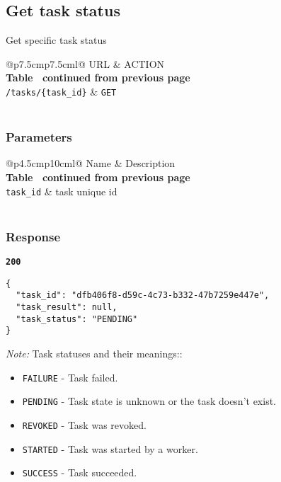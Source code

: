 \subsection{Get task status}
Get specific task status

\begin{longtable}[c]{@{}p{7.5cm}p{7.5cm}l@{}}
  \toprule
  URL                          & ACTION                       \\* \midrule
  \endfirsthead
  \multicolumn{3}{c}%
  {{\bfseries Table \thetable\ continued from previous page}} \\
  \endhead
  \bottomrule
  \endfoot
  \endlastfoot
  \texttt{/tasks/\{task\_id\}} & \texttt{GET}                 \\* \bottomrule
  \label{tab:rdf-validator-get-task}                          \\
\end{longtable}

\subsubsection{Parameters}
\begin{longtable}[c]{@{}p{4.5cm}p{10cm}l@{}}
  \toprule
  Name              & Description                             \\* \midrule
  \endfirsthead
  \multicolumn{3}{c}%
  {{\bfseries Table \thetable\ continued from previous page}} \\
  \endhead
  \bottomrule
  \endfoot
  \endlastfoot
  \texttt{task\_id} & task unique id                          \\* \bottomrule
  \label{tab:rdf-validator-get-task-parameters}               \\
\end{longtable}

\subsubsection{Response}
\textbf{\texttt{200}}
\begin{lstlisting}
{
  "task_id": "dfb406f8-d59c-4c73-b332-47b7259e447e",
  "task_result": null,
  "task_status": "PENDING"
}
\end{lstlisting}

\textit{Note:} Task statuses and their meanings::
\begin{itemize}
  \item \texttt{FAILURE} - Task failed.
  \item \texttt{PENDING} - Task state is unknown or the task doesn't exist.
  \item \texttt{REVOKED} - Task was revoked.
  \item \texttt{STARTED} - Task was started by a worker.
  \item \texttt{SUCCESS} - Task succeeded.
\end{itemize}


